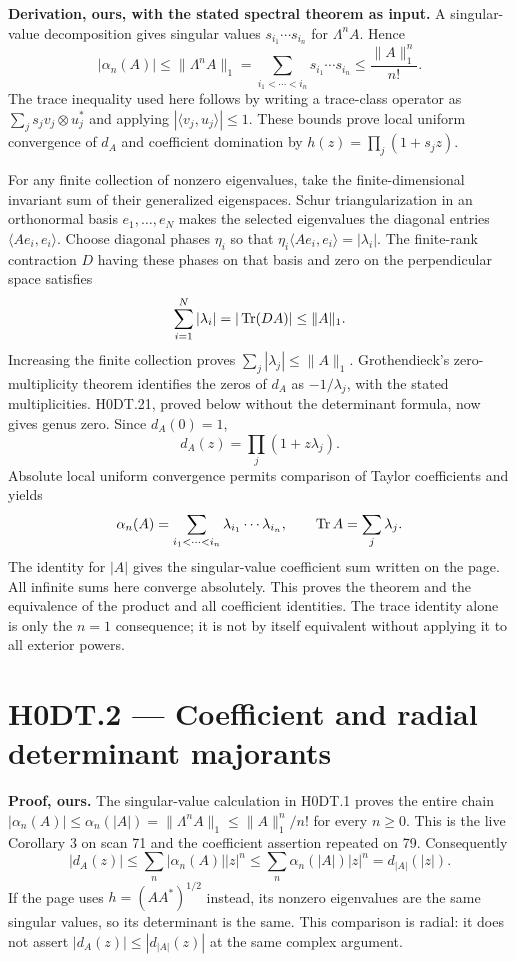 \textbf{Derivation, ours, with the stated spectral theorem as input.} A singular-value decomposition gives singular values $s_{i_1}\cdots s_{i_n}$ for $\Lambda^n A$. Hence
\[
 |\alpha_n(A)|\le \|\Lambda^n A\|_1
 =\sum_{i_1<\cdots<i_n}s_{i_1}\cdots s_{i_n}
 \le \frac{\|A\|_1^n}{n!}.
\]
The trace inequality used here follows by writing a trace-class operator as $\sum_j s_j v_j\otimes u_j^*$ and applying $|\langle v_j,u_j\rangle|\le1$. These bounds prove local uniform convergence of $d_A$ and coefficient domination by $h(z)=\prod_j(1+s_jz)$.

For any finite collection of nonzero eigenvalues, take the finite-dimensional invariant sum of their generalized eigenspaces. Schur triangularization in an orthonormal basis $e_1,\ldots,e_N$ makes the selected eigenvalues the diagonal entries $\langle Ae_i,e_i\rangle$. Choose diagonal phases $\eta_i$ so that $\eta_i\langle Ae_i,e_i\rangle=|\lambda_i|$. The finite-rank contraction $D$ having these phases on that basis and zero on the perpendicular space satisfies
\[
 \sum_{i=1}^N|\lambda_i|=|\operatorname{Tr}(DA)|\le\|A\|_1.
\]
Increasing the finite collection proves $\sum_j|\lambda_j|\le\|A\|_1$. Grothendieck's zero-multiplicity theorem identifies the zeros of $d_A$ as $-1/\lambda_j$, with the stated multiplicities. H0DT.21, proved below without the determinant formula, now gives genus zero. Since $d_A(0)=1$,
\[
 d_A(z)=\prod_j(1+z\lambda_j).
\]
Absolute local uniform convergence permits comparison of Taylor coefficients and yields
\[
 \alpha_n(A)=\sum_{i_1<\cdots<i_n}\lambda_{i_1}\cdots\lambda_{i_n},\qquad
 \operatorname{Tr} A=\sum_j\lambda_j.
\]
The identity for $|A|$ gives the singular-value coefficient sum written on the page. All infinite sums here converge absolutely. This proves the theorem and the equivalence of the product and all coefficient identities. The trace identity alone is only the $n=1$ consequence; it is not by itself equivalent without applying it to all exterior powers.

\section*{H0DT.2 --- Coefficient and radial determinant majorants}
\textbf{Proof, ours.} The singular-value calculation in H0DT.1 proves the entire chain $|\alpha_n(A)|\le\alpha_n(|A|)=\|\Lambda^n A\|_1\le\|A\|_1^n/n!$ for every $n\ge0$. This is the live Corollary 3 on scan 71 and the coefficient assertion repeated on 79. Consequently
\[
 |d_A(z)|\le\sum_n|\alpha_n(A)||z|^n
 \le\sum_n\alpha_n(|A|)|z|^n=d_{|A|}(|z|).
\]
If the page uses $h=(AA^*)^{1/2}$ instead, its nonzero eigenvalues are the same singular values, so its determinant is the same. This comparison is radial: it does not assert $|d_A(z)|\le|d_{|A|}(z)|$ at the same complex argument.

